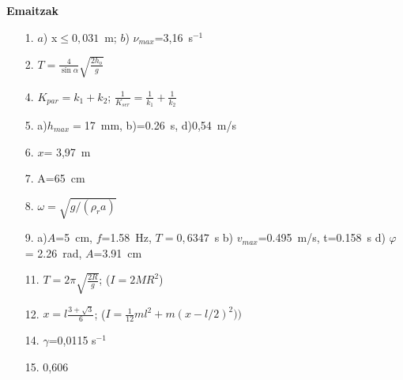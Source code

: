 \documentclass[12pt,twoside]{article}
\begin{document}
{\bf Emaitzak }

\begin{enumerate}
\item[1.] $a$) x$\le0,031$~m; $b$) $\nu_{max}$=3,16~s$^{-1}$
\item[2.] $T=\frac{4}{\sin\alpha}\sqrt{\frac{2h_o}{g}}$
\item[4.] $K_{par}=k_1+k_2$; $\frac{1}{K_{ser}}=\frac{1}{k_1}+\frac{1}{k_2}$
\item[5.] a)$h_{max}=$17~mm, b)=0.26~s, d)0,54~m/s
\item[6.] $x$= 3,97~m
\item[7.] A=65~cm
\item[8.]  $\omega=\sqrt{g/(\rho_r a)}$
\item[9.] a)$A$=5~cm, $f$=1.58~Hz, $T=0,6347$~s b) $v_{max}$=0.495~m/s, t=0.158~s
   d) $\varphi$= 2.26~rad, $A$=3.91~cm
\item[11.] $T=2\pi\sqrt{\frac{2R}{g}}$; ($I=2MR^2$)
\item[12.] $x=l\frac{3+\sqrt{3}}{6}$; ($I=\frac{1}{12}ml^2+m(x-l/2)^2))$
\item[14.] $\gamma$=0,0115 s$^{-1}$
\item[15.] 0,606

\end{enumerate}
\end{document}
